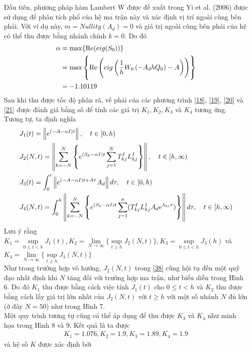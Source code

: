 \begin{vd}
\begin{figure}[h!]
	\label{fig:hinh-19}
\end{figure}
Đầu tiên, phương pháp hàm Lambert W được đề xuất trong Yi et al. (2006) được sử dụng để phân tích phổ của hệ ma trận này và xác định vị trí ngoài cùng bên phải. Với ví dụ này, $m = Nullity(A_d) =0$ và giá trị ngoài cùng bên phải của hệ có thể thu được bằng nhánh chính $k =0$. Do đó
\begin{align}\label{46}
	\alpha &= \max \{ \mathrm{Re}(eig(S_0))\} \notag\\
	& = \max\left\{\mathrm{Re} \left(eig \left(\dfrac{1}{h} W_0\left( -A_dhQ_0\right) - A\right) \right) \right\}	\notag \\
	& = -1.10119	
\end{align}
Sau khi thu được tốc độ phân rã, vế phải của các phương trình \eqref{18}, \eqref{19}, \eqref{20} và \eqref{21} được đánh giá bằng số để tính các giá trị $K_1, K_2, K_3$ và $K_4$ tương ứng. Tương tự, ta định nghĩa
\begin{align}
	&J_1(t) = \left \Vert e^{(-A-\alpha I)t} \right\Vert, \quad t \in [0,h)\\
	&J_2(N, t) = \left\Vert \sum_{k=-N}^N\left\{e^{(S_k-\alpha I)t} \sum_{j=1}^N T^I_{kj}L^I_{kj} \right\} \right\Vert, \quad t \in [h, \infty)\\
	&J_3(t) = \int_0^t\left\Vert e^{(-A-\alpha I)t+A\tau}A_d\right\Vert d\tau, \quad t \in [0,h)\\
	&J_4(N,t)= \int^h_0 \left\Vert \sum_{k=-N}^N \left\{e^{(S_k-\alpha I)t} \sum_{j =1}^n(T^I_{kj}L^I_{kj}A_de^{\lambda_{ki}\tau})\right\}\right\Vert d\tau, \quad t \in [h, \infty)
 \end{align}
Lưu ý rằng $K_1 =\sup\limits_{0 \le t <h}J_1(t), K_2 = \lim\limits_{N\to \infty} \{\sup\limits_{t \ge h}J_2(N,t)\}, K_3 = \sup\limits_{0 \le t <h}J_3(h)$ và $K_4 = \lim\limits_{N\to \infty} \{\sup\limits_{t \ge h}J_4(N,t)\}$\\
Như trong trường hợp vô hướng, $J_2(N,t)$ trong \eqref{38} cũng hội tụ  đến một quỹ đạo nhất định khi $N$ tăng đối với trường hợp ma trận, như biểu diễn trong Hình 6. Do đó $K_1$ thu được bằng cách việc tính $J_1(t)$ cho $0 \le t<h$ và $K_2$ thu được bằng cách lấy giá trị lớn nhất của $J_2(N,t)$ với $t \ge h$ với một số nhánh $N$ đủ lớn (ở đây $N = 50$) như trong Hình 7.\\
Một quy trình tương tự cũng có thể áp dụng để thu được $K_3$ và $K_4$ như minh họa trong Hình 8 và 9. Kết quả là ta được
\begin{align*}
	K_1 = 1.076, K_2 = 1.9, K_3 = 1.89, K_4 = 1.9
\end{align*}
và hệ số $K$ được xác định bởi 

\end{vd}
